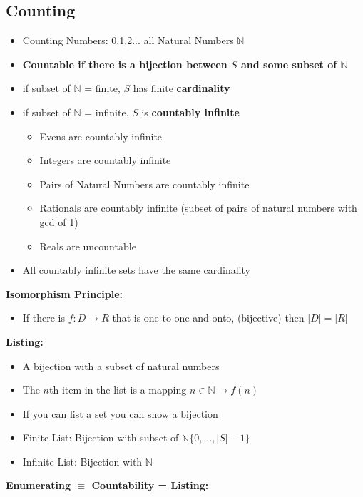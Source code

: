 \documentclass{article}\usepackage{amsmath,amssymb,amsthm,tikz,tkz-graph,color,chngpage,soul,hyperref,csquotes,graphicx,floatrow,circuitikz}\newcommand*{\QEDB}{\hfill\ensuremath{\square}}\newtheorem*{prop}{Proposition}\renewcommand{\theenumi}{\alph{enumi}}\usepackage[shortlabels]{enumitem}\usepackage[nobreak=true]{mdframed}\usetikzlibrary{matrix,calc}\MakeOuterQuote{"}\usepackage[margin=0.75in]{geometry} \newtheorem{theorem}{Theorem}
\begin{document}
\subsection*{Counting}
\begin{itemize}
    \item Counting Numbers: 0,1,2... all Natural Numbers $\mathbb{N}$
    \item \textbf{Countable if there is a bijection between $S$ and some subset of $\mathbb{N}$}
    \item if subset of $\mathbb{N}$ = finite, $S$ has finite \textbf{cardinality}
    \item if subset of $\mathbb{N}$ = infinite, $S$ is \textbf{countably infinite}
        \begin{itemize}
            \item Evens are countably infinite
            \item Integers are countably infinite
            \item Pairs of Natural Numbers are countably infinite
            \item Rationals are countably infinite (subset of pairs of natural numbers with gcd of 1)
            \item Reals are uncountable
        \end{itemize}
    \item All countably infinite sets have the same cardinality
\end{itemize}
\textbf{Isomorphism Principle:}
\begin{itemize}
    \item If there is $f: D\rightarrow R$ that is one to one and onto, (bijective) then $|D| = |R|$
\end{itemize}
\textbf{Listing:}
\begin{itemize}
    \item A bijection with a subset of natural numbers
    \item The $n$th item in the list is a mapping $n \in \mathbb{N} \rightarrow f(n)$
    \item If you can list a set you can show a bijection
    \item Finite List: Bijection with subset of $\mathbb{N}\{0, ..., |S|-1\}$
    \item Infinite List: Bijection with $\mathbb{N}$
\end{itemize}
\textbf{Enumerating $\equiv$ Countability =  Listing:}
\end{document}
